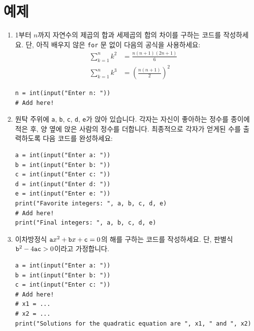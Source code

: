 \documentclass[../main.tex]{subfiles}
\begin{document}
\section{예제}
\begin{enumerate}
  \item 1부터 $n$까지 자연수의 제곱의 합과 세제곱의 합의 차이를 구하는 코드를
    작성하세요.
    단, 아직 배우지 않은 \verb|for| 문 없이 다음의 공식을 사용하세요:
    \begin{align*}
      \sum^{n}_{k = 1} k^2 &= \frac{n(n + 1)(2n + 1)}{6}\\
      \sum^{n}_{k = 1} k^3 &= \left(\frac{n(n + 1)}{2}\right)^2
    \end{align*}
    \begin{verbatim}
n = int(input("Enter n: "))
# Add here!
    \end{verbatim}

  \item 원탁 주위에 \verb|a|, \verb|b|, \verb|c|, \verb|d|, \verb|e|가 앉아
    있습니다.
    각자는 자신이 좋아하는 정수를 종이에 적은 후, 양 옆에 앉은 사람의 정수를
    더합니다.
    최종적으로 각자가 얻게된 수를 출력하도록 다음 코드를 완성하세요:
    \begin{verbatim}
a = int(input("Enter a: "))
b = int(input("Enter b: "))
c = int(input("Enter c: "))
d = int(input("Enter d: "))
e = int(input("Enter e: "))
print("Favorite integers: ", a, b, c, d, e)
# Add here!
print("Final integers: ", a, b, c, d, e)
    \end{verbatim}

  \item 이차방정식 $\verb|a|x^2 + \verb|b|x + \verb|c| = 0$의 해를 구하는
    코드를 작성하세요.
    단, 판별식 $\verb|b|^2 - 4\verb|ac| > 0$이라고 가정합니다.

    \begin{verbatim}
a = int(input("Enter a: "))
b = int(input("Enter b: "))
c = int(input("Enter c: "))
# Add here!
# x1 = ...
# x2 = ...
print("Solutions for the quadratic equation are ", x1, " and ", x2)
    \end{verbatim}


\end{enumerate}
\end{document}
